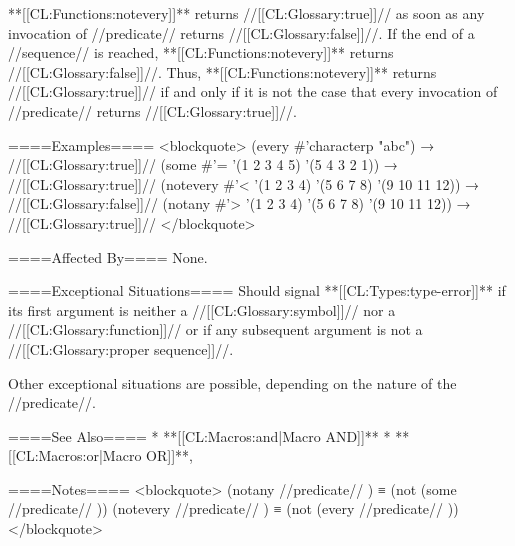 **[[CL:Functions:notevery]]** returns //[[CL:Glossary:true]]// as soon as any invocation of //predicate// returns //[[CL:Glossary:false]]//. If the end of a //sequence// is reached, **[[CL:Functions:notevery]]** returns //[[CL:Glossary:false]]//. Thus, **[[CL:Functions:notevery]]** returns //[[CL:Glossary:true]]// if and only if it is not the case that every invocation of //predicate// returns //[[CL:Glossary:true]]//.

====Examples====
<blockquote> (every #'characterp "abc") → //[[CL:Glossary:true]]// (some #'= '(1 2 3 4 5) '(5 4 3 2 1)) → //[[CL:Glossary:true]]// (notevery #'< '(1 2 3 4) '(5 6 7 8) '(9 10 11 12)) → //[[CL:Glossary:false]]// (notany #'> '(1 2 3 4) '(5 6 7 8) '(9 10 11 12)) → //[[CL:Glossary:true]]// </blockquote>

====Affected By====
None.

====Exceptional Situations====
Should signal **[[CL:Types:type-error]]** if its first argument is neither a //[[CL:Glossary:symbol]]// nor a //[[CL:Glossary:function]]// or if any subsequent argument is not a //[[CL:Glossary:proper sequence]]//.

Other exceptional situations are possible, depending on the nature of the //predicate//.

====See Also====
  * **[[CL:Macros:and|Macro AND]]**
  * **[[CL:Macros:or|Macro OR]]**,

{\secref\TraversalRules}

====Notes====
<blockquote> (notany //predicate// ) ≡ (not (some //predicate// )) (notevery //predicate// ) ≡ (not (every //predicate// )) </blockquote>

